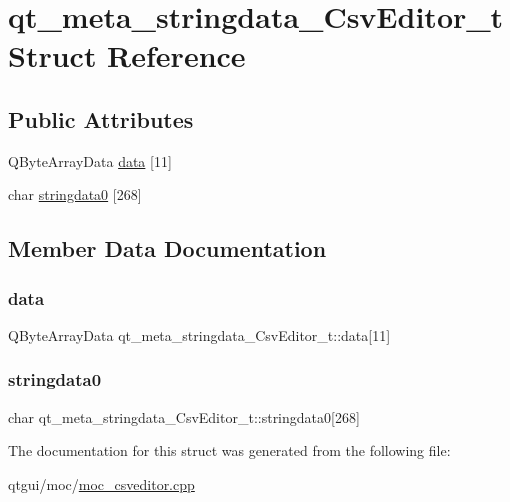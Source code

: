 \hypertarget{structqt__meta__stringdata___csv_editor__t}{}\section{qt\+\_\+meta\+\_\+stringdata\+\_\+\+Csv\+Editor\+\_\+t Struct Reference}
\label{structqt__meta__stringdata___csv_editor__t}
\subsection*{Public Attributes}
\begin{DoxyCompactItemize}
\item 
Q\+Byte\+Array\+Data \mbox{\hyperlink{structqt__meta__stringdata___csv_editor__t_aa19025259670808002c65b9335cd7dd5}{data}} \mbox{[}11\mbox{]}
\item 
char \mbox{\hyperlink{structqt__meta__stringdata___csv_editor__t_ac631b18a4aedd6d22f33c5e7a07813e5}{stringdata0}} \mbox{[}268\mbox{]}
\end{DoxyCompactItemize}


\subsection{Member Data Documentation}
\mbox{\label{structqt__meta__stringdata___csv_editor__t_aa19025259670808002c65b9335cd7dd5}} 
\subsubsection{\texorpdfstring{data}{data}}
{\footnotesize\ttfamily Q\+Byte\+Array\+Data qt\+\_\+meta\+\_\+stringdata\+\_\+\+Csv\+Editor\+\_\+t\+::data\mbox{[}11\mbox{]}}

\mbox{\label{structqt__meta__stringdata___csv_editor__t_ac631b18a4aedd6d22f33c5e7a07813e5}} 
\subsubsection{\texorpdfstring{stringdata0}{stringdata0}}
{\footnotesize\ttfamily char qt\+\_\+meta\+\_\+stringdata\+\_\+\+Csv\+Editor\+\_\+t\+::stringdata0\mbox{[}268\mbox{]}}



The documentation for this struct was generated from the following file\+:\begin{DoxyCompactItemize}
\item 
qtgui/moc/\mbox{\hyperlink{moc__csveditor_8cpp}{moc\+\_\+csveditor.\+cpp}}\end{DoxyCompactItemize}
